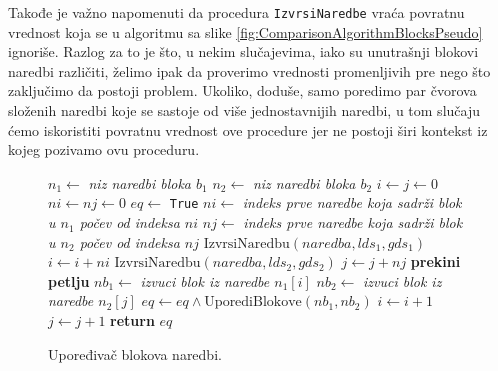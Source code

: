 Takođe je važno napomenuti da procedura \texttt{IzvrsiNaredbe} vraća povratnu vrednost koja se u algoritmu sa slike \ref{fig:ComparisonAlgorithmBlocksPseudo} ignoriše. Razlog za to je što, u nekim slučajevima, iako su unutrašnji blokovi naredbi različiti, želimo ipak da proverimo vrednosti promenljivih pre nego što zaključimo da postoji problem. Ukoliko, doduše, samo poredimo par čvorova složenih naredbi koje se sastoje od više jednostavnijih naredbi, u tom slučaju ćemo iskoristiti povratnu vrednost ove procedure jer ne postoji širi kontekst iz kojeg pozivamo ovu proceduru.

\begin{figure}[!h]
\begin{algorithmic}[1]
\State $n_1 \gets $ \emph{niz naredbi bloka $b_1$} 
\State $n_2 \gets $ \emph{niz naredbi bloka $b_2$}
\State $i \gets j \gets 0$
\State $ni \gets nj \gets 0$
\State $eq \gets $ \texttt{True}
    \State $ni \gets $ \emph{indeks prve naredbe koja sadrži blok u $n_1$ počev od indeksa $ni$}
    \State $nj \gets $ \emph{indeks prve naredbe koja sadrži blok u $n_2$ počev od indeksa $nj$}
        \State $\text{IzvrsiNaredbu}(naredba, lds_1, gds_1)$
    \EndFor
    \State $i \gets i + ni$
        \State $\text{IzvrsiNaredbu}(naredba, lds_2, gds_2)$
    \EndFor
    \State $j \gets j + nj$
        \State \textbf{prekini petlju}
    \EndIf
    \State $nb_1 \gets $ \emph{izvuci blok iz naredbe $n_1[i]$}
    \State $nb_2 \gets $ \emph{izvuci blok iz naredbe $n_2[j]$}
    \State $eq \gets eq \wedge \text{UporediBlokove}(nb_1, nb_2)$
    \State $i \gets i + 1$
    \State $j \gets j + 1$
\EndWhile
\State \textbf{return} $eq$
\EndProcedure
\end{algorithmic}
\caption{Upoređivač blokova naredbi.}
\label{fig:ComparisonAlgorithmBlocksPseudo1}
\end{figure}
